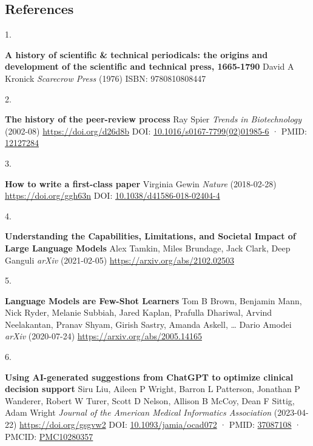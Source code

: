 \documentclass[
]{article}
\newlength{\cslhangindent}
\newlength{\csllabelwidth}
\newlength{\cslentryspacingunit} %
\newenvironment{CSLReferences}[2] %
 {%
  \setlength{\parindent}{0pt}
  \ifodd #1
  \let\oldpar\par
  \def\par{\hangindent=\cslhangindent\oldpar}
  \fi
  \setlength{\parskip}{#2\cslentryspacingunit}
 }%
 {}
\newcommand{\CSLBlock}[1]{#1\hfill\break}
\newcommand{\CSLLeftMargin}[1]{\parbox[t]{\csllabelwidth}{#1}}
\newcommand{\CSLRightInline}[1]{\parbox[t]{\linewidth - \csllabelwidth}{#1}\break}
\providecommand{\DIFaddbegin}{} %
\providecommand{\DIFaddend}{} %
\providecommand{\DIFdelbegin}{} %
\providecommand{\DIFdelend}{} %
\newcommand{\DIFscaledelfig}{0.5}
\newlength{\DIFdelgraphicswidth} %
\newlength{\DIFdelgraphicsheight} %
\newcommand{\DIFaddincludegraphics}[2][]{{\color{blue}\fbox{\DIFOincludegraphics[#1]{#2}}}} %
\newcommand{\DIFdelincludegraphics}[2][]{%
\sbox{\DIFdelgraphicsbox}{\DIFOincludegraphics[#1]{#2}}%
\settoboxwidth{\DIFdelgraphicswidth}{\DIFdelgraphicsbox} %
\settoboxtotalheight{\DIFdelgraphicsheight}{\DIFdelgraphicsbox} %
\scalebox{\DIFscaledelfig}{%
\parbox[b]{\DIFdelgraphicswidth}{\usebox{\DIFdelgraphicsbox}\\[-\baselineskip] \rule{\DIFdelgraphicswidth}{0em}}\llap{\resizebox{\DIFdelgraphicswidth}{\DIFdelgraphicsheight}{%
\setlength{\unitlength}{\DIFdelgraphicswidth}%
\begin{picture}(1,1)%
\thicklines\linethickness{2pt} %
{\color[rgb]{1,0,0}\put(0,0){\framebox(1,1){}}}%
{\color[rgb]{1,0,0}\put(0,0){\line( 1,1){1}}}%
{\color[rgb]{1,0,0}\put(0,1){\line(1,-1){1}}}%
\end{picture}%
}\hspace*{3pt}}} %
} %
\DeclareRobustCommand{\DIFaddbegin}{\DIFOaddbegin \let\includegraphics\DIFaddincludegraphics} %
\DeclareRobustCommand{\DIFaddend}{\DIFOaddend \let\includegraphics\DIFOincludegraphics} %
\DeclareRobustCommand{\DIFdelbegin}{\DIFOdelbegin \let\includegraphics\DIFdelincludegraphics} %
\DeclareRobustCommand{\DIFdelend}{\DIFOaddend \let\includegraphics\DIFOincludegraphics} %
\begin{document}
\hypertarget{references}{%
\subsection{References}\label{references}}

\hypertarget{refs}{}
\begin{CSLReferences}{0}{0}
\leavevmode{}%
\CSLLeftMargin{1. }%
\CSLRightInline{\textbf{A history of scientific \& technical periodicals: the origins and development of the scientific and technical press, 1665-1790}
\CSLBlock{David A Kronick} \emph{Scarecrow Press} (1976)
\CSLBlock{ISBN: 9780810808447}}

\leavevmode{}%
\CSLLeftMargin{2. }%
\CSLRightInline{\textbf{The history of the peer-review process}
\CSLBlock{Ray Spier} \emph{Trends in Biotechnology} (2002-08) \url{https://doi.org/d26d8b}
\CSLBlock{DOI: \href{https://doi.org/10.1016/s0167-7799(02)01985-6}{10.1016/s0167-7799(02)01985-6} · PMID: \href{https://www.ncbi.nlm.nih.gov/pubmed/12127284}{12127284}}}

\leavevmode{}%
\CSLLeftMargin{3. }%
\CSLRightInline{\textbf{How to write a first-class paper}
\CSLBlock{Virginia Gewin} \emph{Nature} (2018-02-28) \url{https://doi.org/ggh63n}
\CSLBlock{DOI: \href{https://doi.org/10.1038/d41586-018-02404-4}{10.1038/d41586-018-02404-4}}}

\leavevmode{}%
\CSLLeftMargin{4. }%
\CSLRightInline{\textbf{Understanding the Capabilities, Limitations, and Societal Impact of Large Language Models}
\CSLBlock{Alex Tamkin, Miles Brundage, Jack Clark, Deep Ganguli} \emph{arXiv} (2021-02-05) \url{https://arxiv.org/abs/2102.02503}}

\leavevmode{}%
\CSLLeftMargin{5. }%
\CSLRightInline{\textbf{Language Models are Few-Shot Learners}
\CSLBlock{Tom B Brown, Benjamin Mann, Nick Ryder, Melanie Subbiah, Jared Kaplan, Prafulla Dhariwal, Arvind Neelakantan, Pranav Shyam, Girish Sastry, Amanda Askell, \ldots{} Dario Amodei} \emph{arXiv} (2020-07-24) \url{https://arxiv.org/abs/2005.14165}}

\leavevmode\vadjust pre{\DIFdelbegin %
\DIFdelend \DIFaddbegin \hypertarget{ref-gRhoGuC4}{}\DIFaddend }%
\CSLLeftMargin{6. }%
\DIFaddbegin \CSLRightInline{\textbf{Using AI-generated suggestions from ChatGPT to optimize clinical decision support}
\CSLBlock{Siru Liu, Aileen P Wright, Barron L Patterson, Jonathan P Wanderer, Robert W Turer, Scott D Nelson, Allison B McCoy, Dean F Sittig, Adam Wright} \emph{Journal of the American Medical Informatics Association} (2023-04-22) \url{https://doi.org/gsgvw2}
\CSLBlock{DOI: \href{https://doi.org/10.1093/jamia/ocad072}{10.1093/jamia/ocad072} · PMID: \href{https://www.ncbi.nlm.nih.gov/pubmed/37087108}{37087108} · PMCID: \href{https://www.ncbi.nlm.nih.gov/pmc/articles/PMC10280357}{PMC10280357}}}


\end{CSLReferences}
\end{document}
